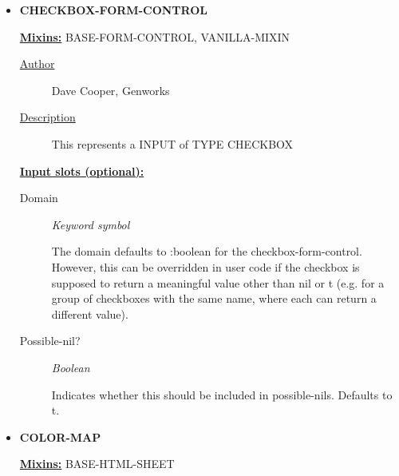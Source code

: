 \documentclass [11pt]{book}
\begin{document}
\begin{itemize}
\item {}
\label{prim:checkbox-form-control}
\textbf{CHECKBOX-FORM-CONTROL}


\textbf{
\underline{Mixins:}} BASE-FORM-CONTROL, VANILLA-MIXIN





\begin{description}

\item [
\underline{Author}]


Dave Cooper, Genworks



\item [
\underline{Description}]


This represents a INPUT of TYPE CHECKBOX



\end{description}








\textbf{
\underline{Input slots (optional):}}

\begin{description}

\item [Domain]
\emph{Keyword symbol}

 The domain defaults to :boolean for the checkbox-form-control.
However, this can be overridden in user code if the checkbox is supposed to return
a meaningful value other than nil or t (e.g. for a group of checkboxes with
the same name, where each can return a different value).




\item [Possible-nil?]
\emph{Boolean}

 Indicates whether this should be included in possible-nils. Defaults to t.




\end{description}







\item {}
\label{prim:color-map}
\textbf{COLOR-MAP}


\textbf{
\underline{Mixins:}} BASE-HTML-SHEET






\end{itemize}
\end{document}
